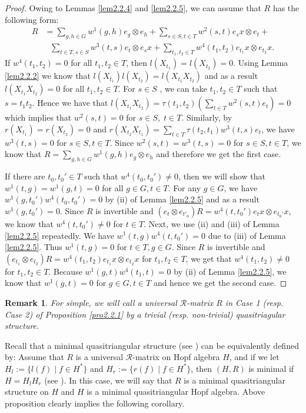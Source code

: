 \documentclass[a4paper,11pt]{amsart}
\numberwithin{equation}{section}
\newtheorem{remark}[theorem]{Remark}
\begin{document}
\begin{proof}
Owing to Lemmas \ref{lem2.2.4} and \ref{lem2.2.5}, we can assume that $R$ has the following form:
\begin{align*}
R&=\sum_{g,h \in G}w^1(g,h)e_{g} \otimes e_{h}+ \sum_{s \in S,t \in T}w^2(s,t)e_{s}x \otimes e_{t}+\\
&\ \ \   \sum_{t \in T,s \in S}w^3(t,s)e_{t} \otimes e_{s}x+
         \sum_{t_1,t_2 \in T}w^4(t_1,t_2)e_{t_1}x \otimes e_{t_2}x.
\end{align*}
If $w^4(t_1,t_2)=0$ for all $t_1,t_2 \in T$, then $l(X_{t_1})=l(X_{t_2})=0$. Using Lemma \ref{lem2.2.2} we know that $l(X_{t_1})l(X_{t_2})=l(X_{t_1}X_{t_2})$ and as a result $l(X_{t_1}X_{t_2})=0$ for all $t_1,t_2 \in T$. For $s\in S$ , we can take $t_1,t_2\in T$ such that $s=t_1t_2$. Hence we have that $l(X_{t_1}X_{t_2})=\tau(t_1,t_2)(\sum_{t \in T}w^2(s,t)e_t)=0$ which implies that $w^2(s,t)=0$ for $s\in S, \;t \in T$. Similarly, by $r(X_{t_1})=r(X_{t_2})=0$ and $r(X_{t_2}X_{t_1})=\sum_{t \in T}\tau(t_2,t_1)w^3(t,s)e_t$, we have $w^3(t,s)=0$ for $s\in S,t \in T$. Since $w^2(s,t)=w^3(t,s)=0$ for $s\in S, t\in T$, we know that $R=\sum_{g,h\in G}w^1(g,h)e_g \otimes e_h$ and therefore we get the first case.

If there are $t_0,t_0' \in T$ such that $w^4(t_0,t_0')\neq 0$, then we will show that $w^1(t,g)=w^1(g,t)=0$ for all $g\in G, t\in T$.
For any $g\in G$, we have $w^1(g,t_0')w^4(t_0,t_0')=0$ by (ii) of Lemma \ref{lem2.2.5} and as a result $w^1(g,t_0')=0$. Since $R$ is invertible and $(e_t\otimes e_{t'_0})R=w^4(t,t_0')e_tx\otimes e_{t_0'}x$, we know that $w^4(t,t_0') \neq 0$ for $t\in T$. Next, we use (ii) and (iii) of Lemma \ref{lem2.2.5} repeatedly. We have $w^1(t,g)w^4(t,t_0')=0$ due to (iii) of Lemma \ref{lem2.2.5}. Thus $w^1(t,g)=0$ for $t\in T ,g\in G$. Since $R$ is invertible and $(e_{t_1}\otimes e_{t_2})R=w^4(t_1,t_2)e_{t_1}x\otimes e_{t_2}x$  for $t_1,t_2\in T$,  we get that $w^4(t_1,t_2)\neq 0$ for $t_1,t_2\in T$. Because $w^1(g,t)w^4(t_1,t)=0$ by (ii) of Lemma \ref{lem2.2.5}, we know that $w^1(g,t)=0$ for $g\in G,t \in T$ and hence we get the second case.
\end{proof}

\begin{remark}\emph{For simple, we will call a universal $\mathcal{R}$-matrix $R$ in Case 1 (resp. Case 2) of Proposition \ref{pro2.2.1} by a \emph{trivial} (resp. \emph{non-trivial}) quasitriagular structure.}\end{remark}

Recall that a minimal quasitriangular structure (see \cite[Definition 12.2.14]{R}) can be equivalently defined by: Assume that $R$ is a universal $\mathcal{R}$-matrix on Hopf algebra $H$, and if we let $H_l:=\{l(f)\;|\;f\in H^*\}$ and $H_r:=\{r(f)\;|\;f\in H^*\}$, then $(H,R)$ is minimal if $H=H_lH_r$ (see \cite[Proposition 12.2.13]{R}). In this case, we will say that $R$ is a minimal quasitriangular structure on $H$ and $H$ is a minimal quasitriangular Hopf algebra. Above proposition clearly implies the following corollary.
\end{document}
